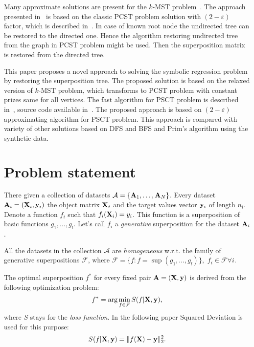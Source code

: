 \documentclass[11pt, tightenlines, twoside, onecolumn, nofloats, nobibnotes, nofootinbib, superscriptaddress, noshowpacks, centertags]{revtex4}
\begin{document}
Many approximate solutions are present for the $k$-MST problem~\cite{ravi1996spanning,awerbuch1998new,Arora2006}. The approach presented in~\cite{Arora2006} is based on the classic PCST problem solution with $(2-\varepsilon)$ factor, which is described in~\cite{goemans1995general}. In case of known root node the undirected tree can be restored to the directed one. Hence the algorithm restoring undirected tree from the graph in PCST problem might be used. Then the superposition matrix is restored from the directed tree.

This paper proposes a novel approach to solving the symbolic regression problem by restoring the superposition tree. The proposed solution is based on the relaxed version of $k$-MST problem, which transforms to PCST problem with constant prizes same for all vertices. The fast algorithm for PSCT problem is described in~\cite{hegde2014fast}, source code available in~\cite{pcstfast_alg}. The proposed approach is based on $(2-\varepsilon)$ approximating algorithm for PSCT problem. This approach is compared with variety of other solutions based on DFS and BFS and Prim's algorithm using the synthetic data.

\section{Problem statement}

There given a collection of datasets $\mathcal{A}=\{\bold A_1,\ldots,\bold A_N\}$. Every dataset $\bold A_i=(\bold X_i,\bold y_i)$ the object matrix $\bold X_i$ and the target values vector $\bold y_i$ of length $n_i$. Denote a function $f_i$ such that $f_i(\bold X_i) = y_i$. This function is a superposition of basic functions $g_1,\ldots,g_l$. Let's call $f_i$ a \emph{generative} superposition for the dataset $\bold A_i$.

All the datasets in the collection $\mathcal{A}$ are \emph{homogeneous} w.r.t. the family of generative superpositions $\mathcal{F}$, where $\mathcal{F}=\{f:f=\sup(g_1,\ldots,g_l)\},$  $f_i\in\mathcal{F} \forall i$. 

The optimal superposition $f^{\ast}$ for every fixed pair $\bold A= (\bold X,\bold y)$ is derived from the following optimization problem:
\begin{align}
f^{\ast} = \arg\min\limits_{f\in \mathcal{F}}S(f|\bold X,\bold y),
\label{task_1}
\end{align}
where $S$ stays for the \emph{loss function}. In the following paper Squared Deviation is used for this purpose:
\[S(f|\bold X,\bold y)= \| f(\bold X)-\bold y\|_2^2.\]
\end{document}
